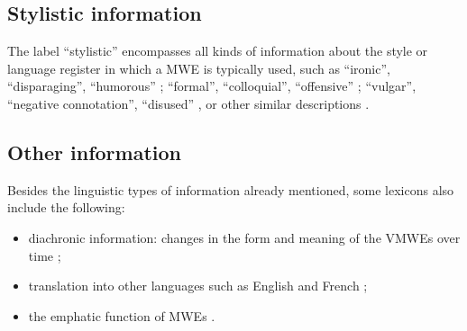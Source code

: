 \documentclass[output=paper,colorlinks,citecolor=brown]{langscibook}
\begin{document}
\subsection{Stylistic information} \label{sec:stylistic}

The label ``stylistic'' encompasses all kinds of information about the style or language register in which a MWE is typically used, such as ``ironic'', ``disparaging'', ``humorous'' \citep{fellbaum2005}; ``formal'', ``colloquial'', ``offensive'' \citep{markantonatou-etal-2019-idion,markantonatou-etal-in-prep}; ``vulgar'', ``negative connotation'', ``disused'' \citep{Autelli2020}, or other similar descriptions . 

\subsection{Other information}
Besides the linguistic types of information already mentioned, some lexicons also include the following:
\begin{itemize}
    \item diachronic information: changes in the form and meaning of the VMWEs over time \citep{fellbaum2005};
    \item translation into other languages such as English \citep{al-hajetal2013, markantonatou-etal-2019-idion, markantonatou-etal-in-prep} 
    and French \citep{markantonatou-etal-2019-idion, markantonatou-etal-in-prep,chapters/02};
    \item the emphatic function of MWEs \citep{Fotopoulou-et-al-2014, markantonatou-etal-2019-idion, markantonatou-etal-in-prep}. 
\end{itemize}

    






\end{document}
